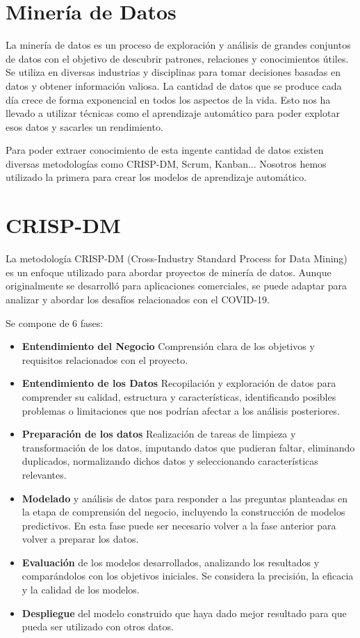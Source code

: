 
\section{Minería de Datos}

La minería de datos es un proceso de exploración y análisis de grandes conjuntos de datos con el objetivo de descubrir patrones, relaciones y conocimientos útiles. Se utiliza en diversas industrias y disciplinas para tomar decisiones basadas en datos y obtener información valiosa. La cantidad de datos que se produce cada día crece de forma exponencial en todos los aspectos de la vida. Esto nos ha llevado a utilizar técnicas como el aprendizaje automático para poder explotar esos datos y sacarles un rendimiento.

Para poder extraer conocimiento de esta ingente cantidad de datos existen diversas metodologías como CRISP-DM, Scrum, Kanban... Nosotros hemos utilizado la primera para crear los modelos de aprendizaje automático.

\section{CRISP-DM}

La metodología CRISP-DM (Cross-Industry Standard Process for Data Mining) es un enfoque utilizado para abordar proyectos de minería de datos. Aunque originalmente se desarrolló para aplicaciones comerciales, se puede adaptar para analizar y abordar los desafíos relacionados con el COVID-19.

Se compone de 6 fases:
\begin{itemize}
	\item \textbf{Entendimiento del Negocio} Comprensión clara de los objetivos y requisitos relacionados con el proyecto.
	\item \textbf{Entendimiento de los Datos} Recopilación y exploración de datos para comprender su calidad, estructura y características, identificando posibles problemas o limitaciones que nos podrían afectar a los análisis posteriores.
    \item \textbf{Preparación de los datos} Realización de tareas de limpieza y transformación de los datos, imputando datos que pudieran faltar, eliminando duplicados, normalizando dichos datos y seleccionando características relevantes.
    \item \textbf{Modelado} y análisis de datos para responder a las preguntas planteadas en la etapa de comprensión del negocio, incluyendo la construcción de modelos predictivos. En esta fase puede ser necesario volver a la fase anterior para volver a preparar los datos.
    \item \textbf{Evaluación} de los modelos desarrollados, analizando los resultados y comparándolos con los objetivos iniciales. Se considera la precisión, la eficacia y la calidad de los modelos.
    \item \textbf{Despliegue} del modelo construido que haya dado mejor resultado para que pueda ser utilizado con otros datos.
\end{itemize}

